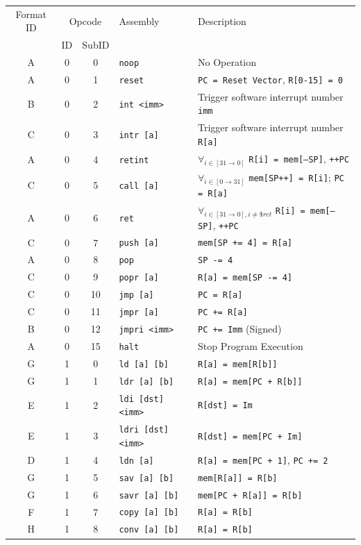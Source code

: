 \documentclass{article}
\begin{document}
\begin{table}[h!]
	\centering
	\begin{footnotesize}
		\begin{tabular}{c|cc|l|l}
			\hline
			Format ID & \multicolumn{2}{c|}{Opcode} & Assembly & Description \\
			{} & ID & SubID & {} & {} \\
			\hline
			A & 0 & 0 & \texttt{noop} & No Operation \\
			A & 0 & 1 & \texttt{reset} & \texttt{PC = Reset Vector}, \texttt{R[0-15] = 0} \\
			B & 0 & 2 & \texttt{int <imm>} & Trigger software interrupt number \texttt{imm} \\
			C & 0 & 3 & \texttt{intr [a]} & Trigger software interrupt number \texttt{R[a]} \\
			A & 0 & 4 & \texttt{retint} & $\forall_{i \in [31 \rightarrow 0]}$ \texttt{R[i] = mem[--SP]}, \texttt{++PC} \\
			C & 0 & 5 & \texttt{call [a]} &  $\forall_{i \in [0 \rightarrow 31]}$ \texttt{mem[SP++] = R[i]}; \texttt{PC = R[a]} \\
			A & 0 & 6 & \texttt{ret} & $\forall_{i \in [31 \rightarrow 0], i \not= \$ret}$ \texttt{R[i] = mem[--SP]}, \texttt{++PC} \\
			C & 0 & 7 & \texttt{push [a]} & \texttt{mem[SP += 4] = R[a]} \\
			A & 0 & 8 & \texttt{pop} & \texttt{SP -= 4} \\
			C & 0 & 9 & \texttt{popr [a]} & \texttt{R[a] = mem[SP -= 4]} \\
			C & 0 & 10 & \texttt{jmp [a]} & \texttt{PC = R[a]} \\
			C & 0 & 11 & \texttt{jmpr [a]} & \texttt{PC += R[a]} \\
			B & 0 & 12 & \texttt{jmpri <imm>} & \texttt{PC += Imm} (Signed) \\
			A & 0 & 15 & \texttt{halt} & Stop Program Execution \\

			G & 1 & 0 & \texttt{ld [a] [b]} & \texttt{R[a] = mem[R[b]]} \\
			G & 1 & 1 & \texttt{ldr [a] [b]} & \texttt{R[a] = mem[PC + R[b]]} \\
			E & 1 & 2 & \texttt{ldi [dst] <imm>} & \texttt{R[dst] = Im} \\
			E & 1 & 3 & \texttt{ldri [dst] <imm>} & \texttt{R[dst] = mem[PC + Im]} \\
			D & 1 & 4 & \texttt{ldn [a]} & \texttt{R[a] = mem[PC + 1]}, \texttt{PC += 2} \\
			G & 1 & 5 & \texttt{sav [a] [b]} & \texttt{mem[R[a]] = R[b]} \\
			G & 1 & 6 & \texttt{savr [a] [b]} & \texttt{mem[PC + R[a]] = R[b]} \\
			F & 1 & 7 & \texttt{copy [a] [b]} & \texttt{R[a] = R[b]} \\
			H & 1 & 8 & \texttt{conv [a] [b]} & \texttt{R[a] = R[b]} \\


\end{tabular}
\end{footnotesize}
\end{table}
\end{document}
